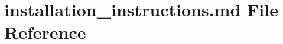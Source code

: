 \hypertarget{installation__instructions_8md}{}\section{installation\+\_\+instructions.\+md File Reference}
\label{installation__instructions_8md}
